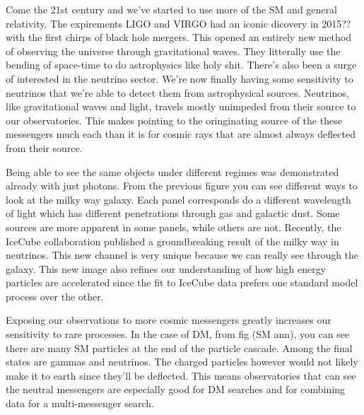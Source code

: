 
Come the 21st century and we've started to use more of the SM and general relativity.
The expirements LIGO and VIRGO had an iconic dicovery in 2015??\fu with the first chirps of black hole mergers.
This opened an entirely new method of observing the universe through gravitational waves.
They litterally use the bending of space-time to do astrophysics like holy shit.
There's also been a surge of interested in the neutrino sector.
We're now finally having some sensitivity to neutrinos that we're able to detect them from astrophysical sources.
Neutrinos, like gravitational waves and light, travels mostly unimpeded from their source to our observatories.
This makes pointing to the oringinating source of the these messengers much each than it is for cosmic rays that are almost always deflected from their source.


Being able to see the same objects under different regimes was demonstrated already with just photons.
From the previous figure you can see different ways to look at the milky way galaxy.
Each panel corresponds do a different wavelength of light which has different penetrations through gas and galactic dust.
Some sources are more apparent in some panels, while others are not.
Recently, the IceCube collaboration published a groundbreaking result of the milky way in neutrinos.
This new channel is very unique because we can really see through the galaxy.
This new image also refines our understanding of how high energy particles are accelerated since the fit to IceCube data prefers one standard model process over the other.

Exposing our observations to more cosmic messengers greatly increases our sensitivity to rare processes.
In the case of DM, from fig (SM ann), you can see there are many SM particles at the end of the particle cascade.
Among the final states are gammas and neutrinos.
The charged particles however would not likely make it to earth since they'll be deflected.
This means observatories that can see the neutral messengers are especially good for DM searches and for combining data for a multi-messenger search.



